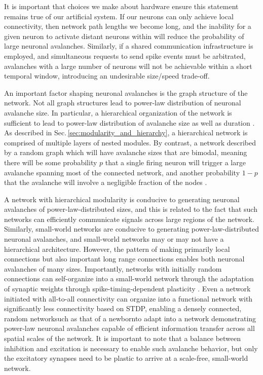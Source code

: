 \documentclass[twocolumn]{article}
\begin{document}
It is important that choices we make about hardware ensure this statement remains true of our artificial system. If our neurons can only achieve local connectivity, then network path lengths we become long, and the inability for a given neuron to activate distant neurons within will reduce the probability of large neuronal avalanches. Similarly, if a shared communication infrastructure is employed, and simultaneous requests to send spike events must be arbitrated, avalanches with a large number of neurons will not be achievable within a short temporal window, introducing an undesirable size/speed trade-off.

An important factor shaping neuronal avalanches is the graph structure of the network. Not all graph structures lead to power-law distribution of neuronal avalanche size. In particular, a hierarchical organization of the network is sufficient to lead to power-law distribution of avalanche size as well as duration \cite{frla2013}. As described in Sec.\,\ref{sec:modularity_and_hierarchy}, a hierarchical network is comprised of multiple layers of nested modules. By contrast, a network described by a random graph which will have avalanche sizes that are bimodal, meaning there will be some probability $p$ that a single firing neuron will trigger a large avalanche spanning most of the connected network, and another probability $1-p$ that the avalanche will involve a negligible fraction of the nodes \cite{frla2013}.

A network with hierarchical modularity is conducive to generating neuronal avalanches of power-law-distributed sizes, and this is related to the fact that such networks can efficiently communicate signals across large regions of the network. Similarly, small-world networks are conducive to generating power-law-distributed neuronal avalanches, and small-world networks may or may not have a hierarchical architecture. However, the pattern of making primarily local connections but also important long range connections enables both neuronal avalanches of many sizes. Importantly, networks with initially random connections can self-organize into a small-world network through the adaptation of synaptic weights through spike-timing-dependent plasticity \cite{shki2006}. Even a network initiated with all-to-all connectivity can organize into a functional network with significantly less connectivity based on STDP, enabling a densely connected, random network\textemdash such as that of a newborn\textemdash to adapt into a network demonstrating power-law neuronal avalanches capable of efficient information transfer across all spatial scales of the network. It is important to note that a balance between inhibition and excitation is necessary to enable such avalanche behavior, but only the excitatory synapses need to be plastic to arrive at a scale-free, small-world network.
\end{document}
